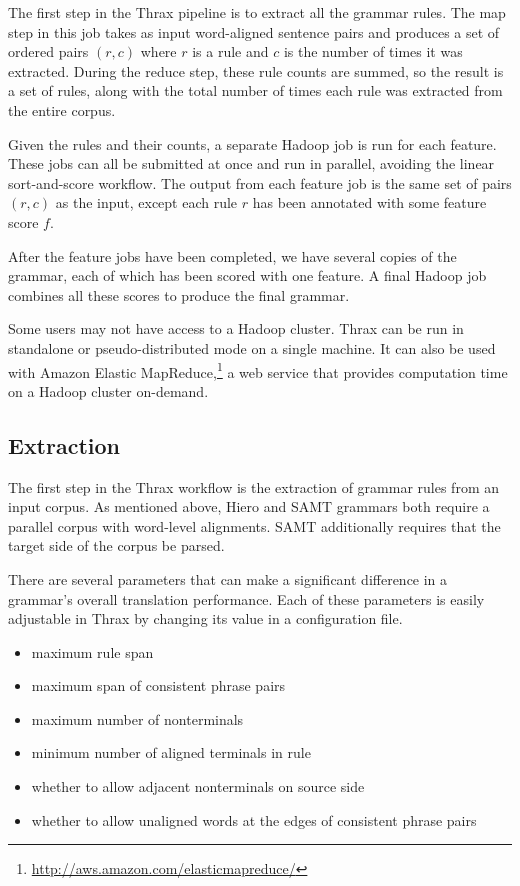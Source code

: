 \documentclass[11pt]{article}
\begin{document}
The first step in the Thrax pipeline is to extract all the grammar rules. The map step in this job takes as input word-aligned sentence pairs and produces a set of ordered pairs $(r,c)$ where $r$ is a rule and $c$ is the number of times it was extracted. During the reduce step, these rule counts are summed, so the result is a set of rules, along with the total number of times each rule was extracted from the entire corpus.

Given the rules and their counts, a separate Hadoop job is run for each feature. These jobs can all be submitted at once and run in parallel, avoiding the linear sort-and-score workflow. The output from each feature job is the same set of pairs $(r,c)$ as the input, except each rule $r$ has been annotated with some feature score $f$.

After the feature jobs have been completed, we have several copies of
the grammar, each of which has been scored with one feature.  A final Hadoop job combines all these scores to produce the final grammar.

Some users may not have access to a Hadoop cluster. Thrax can be run in standalone or pseudo-distributed mode on a single machine. It can also be used with Amazon Elastic MapReduce,\footnote{\url{http://aws.amazon.com/elasticmapreduce/}} a web service that provides computation time on a Hadoop cluster on-demand.

\subsection{Extraction}

The first step in the Thrax workflow is the extraction of grammar rules from an input corpus. As mentioned above, Hiero and SAMT grammars both require a parallel corpus with word-level alignments. SAMT additionally requires that the target side of the corpus be parsed.

There are several parameters that can make a significant difference in a grammar's overall translation performance. Each of these parameters is easily adjustable in Thrax by changing its value in a configuration file.

\begin{itemize}
\item maximum rule span
\item maximum span of consistent phrase pairs
\item maximum number of nonterminals
\item minimum number of aligned terminals in rule
\item whether to allow adjacent nonterminals on source side
\item whether to allow unaligned words at the edges of consistent phrase pairs
\end{itemize}
\end{document}
